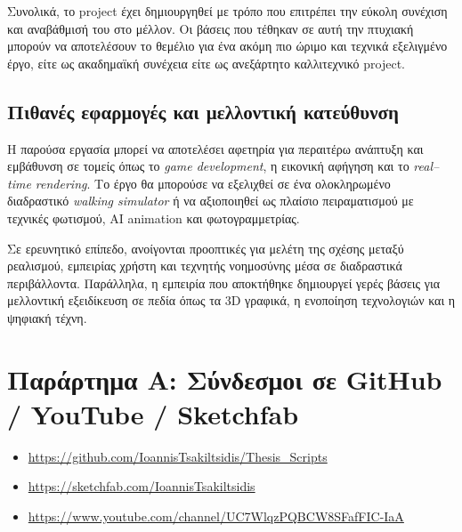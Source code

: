 Συνολικά, το project έχει δημιουργηθεί με τρόπο που επιτρέπει 
την εύκολη συνέχιση και αναβάθμισή του στο μέλλον. 
Οι βάσεις που τέθηκαν σε αυτή την πτυχιακή μπορούν να αποτελέσουν 
το θεμέλιο για ένα ακόμη πιο ώριμο και τεχνικά εξελιγμένο έργο, 
είτε ως ακαδημαϊκή συνέχεια είτε ως ανεξάρτητο καλλιτεχνικό project.
\section{Πιθανές εφαρμογές και μελλοντική κατεύθυνση}
Η παρούσα εργασία μπορεί να αποτελέσει αφετηρία για περαιτέρω ανάπτυξη 
και εμβάθυνση σε τομείς όπως το \textit{game development}, 
η εικονική αφήγηση και το \textit{real–time rendering}. 
Το έργο θα μπορούσε να εξελιχθεί σε ένα ολοκληρωμένο 
διαδραστικό \textit{walking simulator} ή να αξιοποιηθεί 
ως πλαίσιο πειραματισμού με τεχνικές φωτισμού, 
AI animation και φωτογραμμετρίας.

Σε ερευνητικό επίπεδο, ανοίγονται προοπτικές για μελέτη 
της σχέσης μεταξύ ρεαλισμού, εμπειρίας χρήστη και τεχνητής νοημοσύνης 
μέσα σε διαδραστικά περιβάλλοντα. 
Παράλληλα, η εμπειρία που αποκτήθηκε δημιουργεί γερές βάσεις 
για μελλοντική εξειδίκευση σε πεδία όπως 
τα 3D γραφικά, η ενοποίηση τεχνολογιών και η ψηφιακή τέχνη.
\appendix
\chapter{Παράρτημα A: Σύνδεσμοι σε GitHub / YouTube / Sketchfab}

\begin{itemize}
    \item \href{https://github.com/IoannisTsakiltsidis/Thesis_Scripts}{https://github.com/IoannisTsakiltsidis/Thesis_Scripts}
    \item \href{https://sketchfab.com/IoannisTsakiltsidis}{https://sketchfab.com/IoannisTsakiltsidis} 
    \item \href{https://www.youtube.com/channel/UC7WlqzPQBCW8SFafFIC-IaA}{https://www.youtube.com/channel/UC7WlqzPQBCW8SFafFIC-IaA}
\end{itemize}
